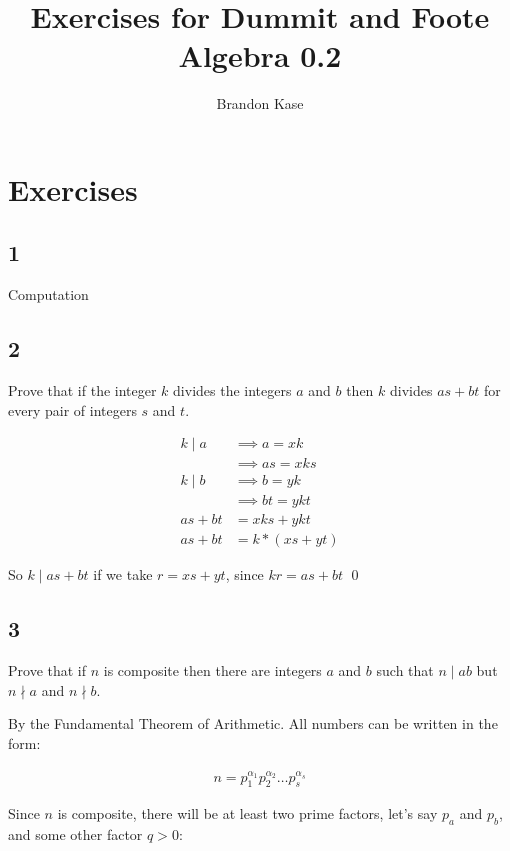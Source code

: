 \documentclass[12pt]{article}
\begin{document}
\title{Exercises for Dummit and Foote Algebra 0.2}
\author{Brandon Kase}
\maketitle

\section*{Exercises}

\subsection*{1}

Computation

\subsection*{2}

Prove that if the integer $k$ divides the integers $a$ and $b$ then $k$ divides $as + bt$ for every pair of integers $s$ and $t$.

\begin{align*}
  k \mid a &\implies a = xk \\
        &\implies as = xks \\
  k \mid b &\implies b = yk \\
        &\implies bt = ykt \\
  as + bt &= xks + ykt \tag*{add the two equations}\\
  as + bt &= k*(xs + yt)
\end{align*}

So $k \mid as + bt$ if we take $r = xs + yt$, since $kr = as + bt$ \qed{}

\subsection*{3}

Prove that if $n$ is composite then there are integers $a$ and $b$ such that $n \mid ab$ but $n \nmid a$ and $n \nmid b$.

By the Fundamental Theorem of Arithmetic. All numbers can be written in the form:

\begin{align*}
  n = p_1^{\alpha_1}p_2^{\alpha_2}\ldots p_s^{\alpha_s}
\end{align*}

Since $n$ is composite, there will be at least two prime factors, let's say $p_a$ and $p_b$, and some other factor $q > 0$:
\end{document}
